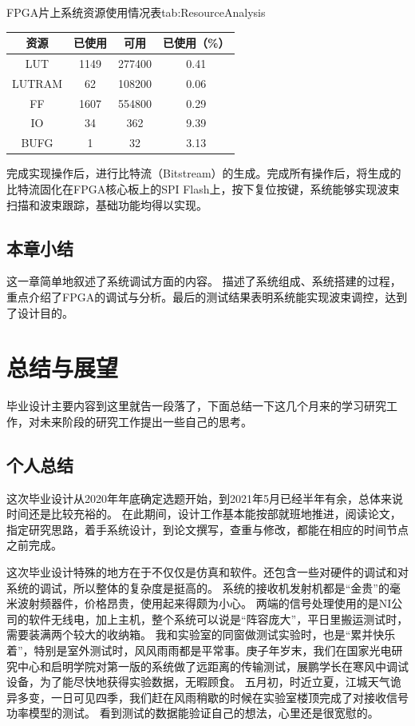 \documentclass[supercite]{HustGraduPaper}
\begin{document}
\begin{generaltab}{FPGA片上系统资源使用情况表}{tab:ResourceAnalysis}
	\begin{tabular}{cccc}
		\toprule
		资源     & 已使用       & 可用      & 已使用（\%）    \\ \midrule
		LUT      & 1149        & 277400    & 0.41           \\
		LUTRAM   & 62          & 108200    & 0.06           \\
		FF       & 1607        & 554800    & 0.29           \\
		IO       & 34          & 362       & 9.39           \\
		BUFG     & 1           & 32        & 3.13           \\
		\bottomrule
	\end{tabular}
\end{generaltab}

完成实现操作后，进行比特流（Bitstream）的生成。完成所有操作后，将生成的比特流固化在FPGA核心板上的SPI Flash上，按下复位按键，系统能够实现波束扫描和波束跟踪，基础功能均得以实现。

\subsection{本章小结}

这一章简单地叙述了系统调试方面的内容。
描述了系统组成、系统搭建的过程，重点介绍了FPGA的调试与分析。最后的测试结果表明系统能实现波束调控，达到了设计目的。

\section{总结与展望}\label{sec:conclusion}

毕业设计主要内容到这里就告一段落了，下面总结一下这几个月来的学习研究工作，对未来阶段的研究工作提出一些自己的思考。

\subsection{个人总结}

这次毕业设计从2020年年底确定选题开始，到2021年5月已经半年有余，总体来说时间还是比较充裕的。
在此期间，设计工作基本能按部就班地推进，阅读论文，指定研究思路，着手系统设计，到论文撰写，查重与修改，都能在相应的时间节点之前完成。

这次毕业设计特殊的地方在于不仅仅是仿真和软件。还包含一些对硬件的调试和对系统的调试，所以整体的复杂度是挺高的。
系统的接收机发射机都是“金贵”的毫米波射频器件，价格昂贵，使用起来得颇为小心。
两端的信号处理使用的是NI公司的软件无线电，加上主机，整个系统可以说是“阵容庞大”，平日里搬运测试时，需要装满两个较大的收纳箱。
我和实验室的同窗做测试实验时，也是“累并快乐着”，特别是室外测试时，风风雨雨都是平常事。庚子年岁末，我们在国家光电研究中心和启明学院对第一版的系统做了远距离的传输测试，展鹏学长在寒风中调试设备，为了能尽快地获得实验数据，无暇顾食。
五月初，时近立夏，江城天气诡异多变，一日可见四季，我们赶在风雨稍歇的时候在实验室楼顶完成了对接收信号功率模型的测试。
看到测试的数据能验证自己的想法，心里还是很宽慰的。
\end{document}
